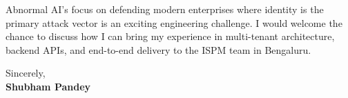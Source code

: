 \documentclass[a4paper,11pt]{article}
\begin{document}
\vspace{6pt}

Abnormal AI's focus on defending modern enterprises where identity is the primary attack vector is an exciting engineering challenge. I would welcome the chance to discuss how I can bring my experience in multi-tenant architecture, backend APIs, and end-to-end delivery to the ISPM team in Bengaluru.

\vspace{14pt}

Sincerely,\\[8pt]
\textbf{Shubham Pandey}
\end{document}
